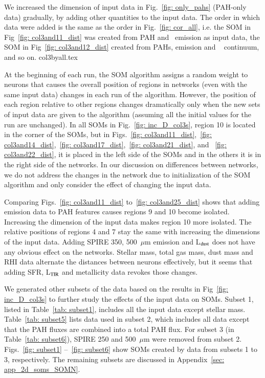             We increased the dimension of input data in Fig.~\ref{fig: only_pahs} (PAH-only data) gradually, by adding other quantities to the input data. 
            The order in which data were added is the same as the order in Fig.~\ref{fig: cor_all}, i.e. the SOM in Fig~\ref{fig: col3and11_dist} was created from PAH and \halpha\ emission as input data, the SOM in Fig~\ref{fig: col3and12_dist} created from PAHs, \halpha emission and \sii~ continuum, and so on. 
            {col3byall.tex}
            
            At the beginning of each run, the SOM algorithm assigns a random weight to neurons that causes the overall position of regions in networks (even with the same input data) changes in each run of the algorithm.
            However, the position of each region relative to other regions changes dramatically only when the new sets of input data are given to the algorithm (assuming all the initial values for the run are unchanged).
            In all SOMs in Fig.~\ref{fig: inc_D_col3s}, region 10 is located in the corner of the SOMs, but in Figs.~\ref{fig: col3and11_dist},~\ref{fig: col3and14_dist},~\ref{fig: col3and17_dist},~\ref{fig: col3and21_dist}, and ~\ref{fig: col3and22_dist}, it is placed in the left side of the SOMs and in the others it is in the right side of the networks.
            In our discussion on differences between networks, we do not address the changes in the network due to initialization of the SOM algorithm and only consider the effect of changing the input data.
            
            Comparing Figs.~\ref{fig: col3and11_dist} to~\ref{fig: col3and25_dist} shows that adding \halpha emission data to PAH features causes regions 9 and 10 become isolated. 
            Increasing the dimension of the input data makes region 10 more isolated.
            The relative positions of regions 4 and 7 stay the same with increasing the dimensions of the input data. 
            Adding SPIRE 350, 500~$\mu$m emission and L$_{\rm dust}$ does not have any obvious effect on the networks.
            Stellar mass, total gas mass, dust mass and RHI data alternate the distances between neurons effectively, but it seems that adding SFR, L$_{\rm TIR}$ and metallicity data revokes those changes.
            
            We generated other subsets of the data based on the results in Fig~\ref{fig: inc_D_col3s} to further study the effects of the input data on SOMs.
            Subset 1, listed in Table~\ref{tab: subset1}, includes all the input data except stellar mass.
            Table~\ref{tab: subset5} lists data used in subset 2, which includes all data except that the PAH fluxes are combined into a total PAH flux. 
            For subset 3 (in Table~\ref{tab: subset6}), SPIRE 250 and 500~$\mu$m were removed from subset 2.
            Figs.~\ref{fig: subset1} --~\ref{fig: subset6} show SOMs created by data from subsets 1 to 3, respectively.
            The remaining subsets are discussed in Appendix~\ref{sec: app_2d_soms_SOMN}.

